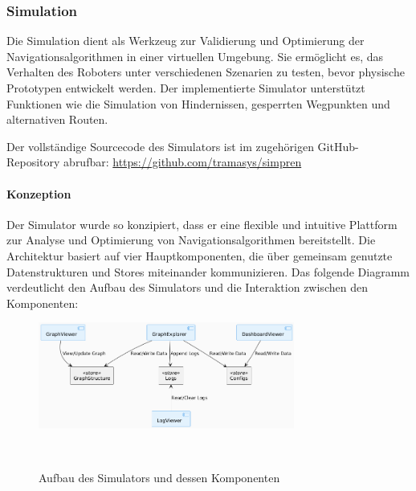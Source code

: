 \documentclass[main.tex]{subfiles} %
\begin{document}
\subsubsection{Simulation}

Die Simulation dient als Werkzeug zur Validierung und Optimierung der 
Navigationsalgorithmen in einer virtuellen Umgebung. 
Sie ermöglicht es, das Verhalten des Roboters unter verschiedenen 
Szenarien zu testen, bevor physische Prototypen entwickelt werden. 
Der implementierte Simulator unterstützt Funktionen wie die Simulation 
von Hindernissen, gesperrten Wegpunkten und alternativen Routen.

Der vollständige Sourcecode des Simulators ist im zugehörigen 
GitHub-Repository abrufbar:
\href{https://github.com/tramasys/simpren}{https://github.com/tramasys/simpren}

\paragraph{Konzeption}

Der Simulator wurde so konzipiert, dass er eine flexible und
intuitive Plattform zur Analyse und Optimierung von
Navigationsalgorithmen bereitstellt. Die Architektur basiert auf vier
Hauptkomponenten, die über gemeinsam genutzte Datenstrukturen und
Stores miteinander kommunizieren. Das folgende Diagramm verdeutlicht
den Aufbau des Simulators und die Interaktion zwischen den Komponenten:

\begin{figure}[H]
  \centering
  \includegraphics[width=0.75\textwidth]{./fig_Simulation/SimulatorKomponentenDiagramm.png}
  \caption{Aufbau des Simulators und dessen
  Komponenten}~\label{fig:SimulatorKomponentenDiagramm}
\end{figure}
\end{document}
